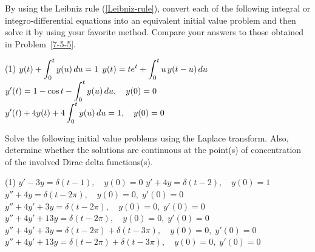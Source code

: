 \begin{Exercise}
	
	
\Question \label{7-5-9} By using the Leibniz rule (\ref{Leibniz-rule}), convert each of the following integral or integro-differential equations into an equivalent initial value problem and then solve it by using your favorite method. Compare your answers to those obtained in Problem~\ref{7-5-5}.
\begin{tasks}[resume=false](1)
	\task $\displaystyle y(t)+\int_0^t y(u)\, du = 1$
	\task $\displaystyle y(t) = te^t+ \int_0^t u\,y(t-u)\, du$
	\task $\displaystyle y'(t) = 1-\cos t - \int_0^t y(u)\, du, \quad y(0) =0$
	\task $\displaystyle y'(t) +4 y(t) + 4 \int_0^t y(u)\, du=1, \quad y(0) =0$
\end{tasks}


\Question\label{7-5-10} Solve the following initial value problems using the Laplace transform. Also, determine whether the solutions are continuous at the point(s) of concentration of the involved Dirac delta functions(s).
\begin{tasks}[resume=false](1)
	\task $y'-3y= \delta(t-1), \quad y(0)= 0$
	\task $y'+4y= \delta(t-2), \quad y(0)= 1$
	\task $y''+4y= \delta(t-2\pi), \quad y(0)= 0, \; y'(0)=0$
	\task $y''+4y'+3y= \delta(t-2\pi), \quad y(0)= 0, \; y'(0)=0$
	\task $y''+4y'+13y= \delta(t-2\pi), \quad y(0)= 0, \; y'(0)=0$
	\task $y''+4y'+3y= \delta(t-2\pi) +\delta(t-3\pi), \quad y(0)= 0, \; y'(0)=0$
	\task $y''+4y'+13y= \delta(t-2\pi) +\delta(t-3\pi), \quad y(0)= 0, \; y'(0)=0$
\end{tasks}

 

\end{Exercise}
